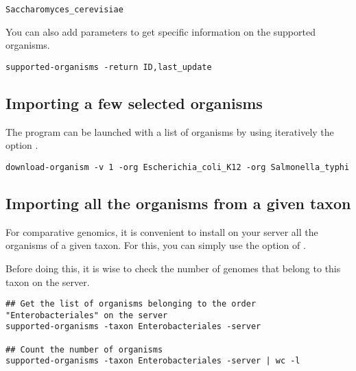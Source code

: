 \begin{footnotesize}
\begin{verbatim}
Saccharomyces_cerevisiae
\end{verbatim}
\end{footnotesize}

You can also add parameters to get specific information on the
supported organisms.

\begin{footnotesize}
\begin{verbatim}
supported-organisms -return ID,last_update
\end{verbatim}
\end{footnotesize}


\subsection{Importing a few selected organisms}

The program  can be launched with a list of
organisms by using iteratively the option .


\begin{footnotesize}
\begin{verbatim}
download-organism -v 1 -org Escherichia_coli_K12 -org Salmonella_typhi
\end{verbatim}
\end{footnotesize}

\subsection{Importing all the organisms from a given taxon}

For comparative genomics, it is convenient to install on your server
all the organisms of a given taxon. For this, you can simply use the
option  of .

Before doing this, it is wise to check the number of genomes that
belong to this taxon on the server.

\begin{footnotesize}
\begin{verbatim}
## Get the list of organisms belonging to the order "Enterobacteriales" on the server
supported-organisms -taxon Enterobacteriales -server

## Count the number of organisms
supported-organisms -taxon Enterobacteriales -server | wc -l
\end{verbatim}
\end{footnotesize}


